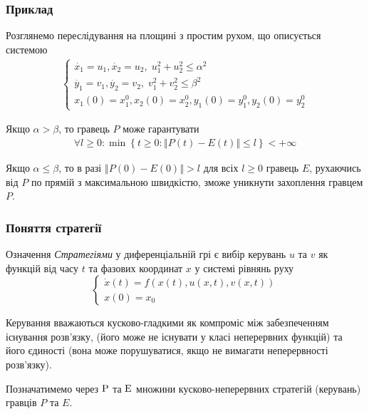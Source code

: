 \documentclass[10pt,pdf]{beamer}
\renewcommand{\d}[1]{\dot{#1}}
\renewcommand{\l}{\left}
\renewcommand{\r}{\right}
\newcommand{\norm}[1]{\left\Vert #1 \right\Vert}
\begin{document}
    \begin{frame}
        \frametitle{Приклад}
    
        Розглянемо переслідування на площині з простим рухом, що описується системою
        \begin{gather*}
            \begin{cases}
                \d{x_1} = u_1, \d{x_2} = u_2, \; u_1^2 + u_2^2 \leq \alpha^2 \\
                \d{y_1} = v_1, \d{y_2} = v_2, \; v_1^2 + v_2^2 \leq \beta^2 \\
                x_1(0) = x_1^0, x_2(0) = x_2^0, y_1(0) = y_1^0, y_2(0) = y_2^0
            \end{cases}
        \end{gather*}

        Якщо $\alpha > \beta$, то гравець $P$ може гарантувати
        \begin{gather*}
            \forall l \geq 0 : \min \l\{ t \geq 0 : \norm{P(t) - E(t)} \leq l\r\} < +\infty
        \end{gather*}

        Якщо $\alpha \leq \beta$, то в разі $\norm{P(0) - E(0)} > l$ для всіх $l \geq 0$ гравець $E$, рухаючись від $P$ по прямій з максимальною швидкістю,
        зможе уникнути захоплення гравцем $P$.
    \end{frame}
    \begin{frame}
        \frametitle{Поняття стратегії}
    
        \begin{block}{Означення}
            \emph{Стратегіями} у диференціальній грі є вибір керувань $u$ та $v$ як функцій від часу $t$ та
            фазових координат $x$ у системі рівнянь руху
            $$
            \begin{cases}
                \d{x}(t) = {f}(x(t), u(x, t), v(x, t)) \\
                x(0) = x_0
            \end{cases}
            $$
        \end{block}
        Керування вважаються кусково-гладкими як компроміс між забезпеченням існування розв'язку, 
        (його може не існувати у класі неперервних функцій) та його єдиності (вона може порушуватися, якщо не вимагати неперервності розв'язку).

        Позначатимемо через $\rm P$ та $\rm E$ множини кусково-неперервних стратегій (керувань) гравців $P$ та $E$. 
    \end{frame}
\end{document}
